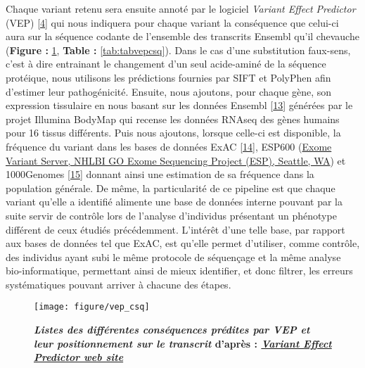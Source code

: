 \documentclass[12pt,a4paper,twoside]{ugathesis}
\begin{document}
Chaque variant retenu sera ensuite annoté par le logiciel \emph{Variant
Effect Predictor} (VEP) {[}\protect\hyperlink{ref-McLaren2016}{4}{]} qui
nous indiquera pour chaque variant la conséquence que celui-ci aura sur
la séquence codante de l'ensemble des transcrits Ensembl qu'il chevauche
(\textbf{Figure : }\ref{fig:pictvepcsq}, \textbf{Table :
}\ref{tab:tabvepcsq}). Dans le cas d'une substitution faux-sens, c'est à
dire entrainant le changement d'un seul acide-aminé de la séquence
protéique, nous utilisons les prédictions fournies par SIFT et PolyPhen
afin d'estimer leur pathogénicité. Ensuite, nous ajoutons, pour chaque
gène, son expression tissulaire en nous basant sur les données Ensembl
{[}\protect\hyperlink{ref-Aken2017}{13}{]} générées par le projet
Illumina BodyMap qui recense les données RNAseq des gènes humains pour
16 tissus différents. Puis nous ajoutons, lorsque celle-ci est
disponible, la fréquence du variant dans les bases de données ExAC
{[}\protect\hyperlink{ref-Lek2016}{14}{]}, ESP600
(\href{http://evs.gs.washington.edu/EVS/}{Exome Variant Server, NHLBI GO
Exome Sequencing Project (ESP), Seattle, WA}) et 1000Genomes
{[}\protect\hyperlink{ref-1000GenomesProjectConsortium2015}{15}{]}
donnant ainsi une estimation de sa fréquence dans la population
générale. De même, la particularité de ce pipeline est que chaque
variant qu'elle a identifié alimente une base de données interne pouvant
par la suite servir de contrôle lors de l'analyse d'individus présentant
un phénotype différent de ceux étudiés précédemment. L'intérêt d'une
telle base, par rapport aux bases de données tel que ExAC, est qu'elle
permet d'utiliser, comme contrôle, des individus ayant subi le même
protocole de séquençage et la même analyse bio-informatique, permettant
ainsi de mieux identifier, et donc filtrer, les erreurs systématiques
pouvant arriver à chacune des étapes.

\begin{figure}

{\centering \texttt{[image: figure/vep\_csq]} 

}

\caption[Listes des différentes conséquences prédites par VEP et leur positionnement sur le transcrit]{\textbf{\emph{Listes des différentes conséquences
prédites par VEP et leur positionnement sur le transcrit} d'après :
\href{http://www.ensembl.org/info/genome/variation/consequences.jpg}{\emph{Variant
Effect Predictor web site}}}}\label{fig:pictvepcsq}
\end{figure}
\end{document}
